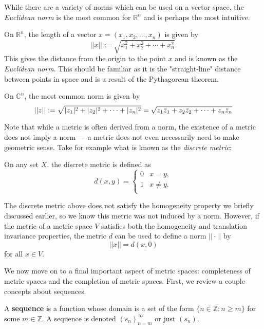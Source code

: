 While there are a variety of norms which can be used on a vector space, the \textit{Euclidean norm} is the most common for $\mathbb{R}^n$ and is perhaps the most intuitive.

\begin{example}
On $\mathbb{R}^n$, the length of a vector $x = (x_1, x_2, ..., x_n)$ is given by
\[||x|| := \sqrt{x_1^2+x_2^2+\cdots+x_n^2}.\]
This gives the distance from the origin to the point $x$ and is known as the \textit{Euclidean norm}.  This should be familiar as it is the "straight-line" distance between points in space and is a result of the Pythagorean theorem.
\end{example}

\begin{example}
On $\mathbb{C}^n$, the most common norm is given by
\[||z|| := \sqrt{|z_1|^2 + |z_2|^2 + \cdots + |z_n|^2} = \sqrt{z_1\bar{z}_1 + z_2\bar{z}_2 + \cdots + z_n\bar{z}_n}\]
\end{example}

Note that while a metric is often derived from a norm, the existence of a metric does not imply a norm --- a metric does not even necessarily need to make geometric sense.  Take for example what is known as the \textit{discrete metric}:

\begin{example}
On any set $X$, the discrete metric is defined as
\[d(x,y)= 
\begin{cases} 
	0 & x=y, \\
	1 & x \neq y.\\
\end{cases}
\]
\end{example}

The discrete metric above does not satisfy the homogeneity property we briefly discussed earlier, so we know this metric was not induced by a norm.  However, if the metric of a metric space $V$ satisfies both the homogeneity and translation invariance properties, the metric $d$ can be used to define a norm $||\cdot||$ by
\[||x|| = d(x,0)\]
for all $x \in V$.

We now move on to a final important aspect of metric spaces: completeness of metric spaces and the completion of metric spaces.  First, we review a couple concepts about sequences.

\begin{defn}
A \textbf{sequence} is a function whose domain is a set of the form $\{n \in \mathbb{Z} : n \geq m\}$ for some $m \in \mathbb{Z}$.  A sequence is denoted $(s_n)_{n=m}^\infty$ or just $(s_n)$.
\end{defn}

